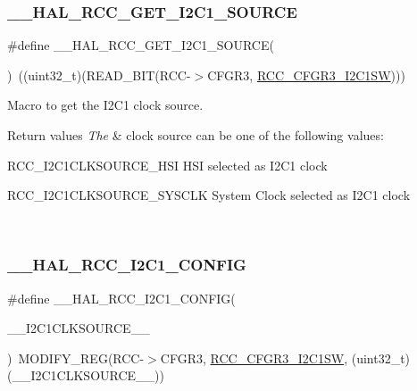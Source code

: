 \subsubsection{\texorpdfstring{\+\_\+\+\_\+\+H\+A\+L\+\_\+\+R\+C\+C\+\_\+\+G\+E\+T\+\_\+\+I2\+C1\+\_\+\+S\+O\+U\+R\+CE}{\_\_HAL\_RCC\_GET\_I2C1\_SOURCE}}
{\footnotesize\ttfamily \#define \+\_\+\+\_\+\+H\+A\+L\+\_\+\+R\+C\+C\+\_\+\+G\+E\+T\+\_\+\+I2\+C1\+\_\+\+S\+O\+U\+R\+CE(\begin{DoxyParamCaption}{ }\end{DoxyParamCaption})~((uint32\+\_\+t)(R\+E\+A\+D\+\_\+\+B\+IT(R\+CC-\/$>$C\+F\+G\+R3, \hyperlink{group___peripheral___registers___bits___definition_gae5a2d49d45df299ff751fb904570d070}{R\+C\+C\+\_\+\+C\+F\+G\+R3\+\_\+\+I2\+C1\+SW})))}



Macro to get the I2\+C1 clock source. 


\begin{DoxyRetVals}{Return values}
{\em The} & clock source can be one of the following values\+: \begin{DoxyItemize}
\item R\+C\+C\+\_\+\+I2\+C1\+C\+L\+K\+S\+O\+U\+R\+C\+E\+\_\+\+H\+SI H\+SI selected as I2\+C1 clock \item R\+C\+C\+\_\+\+I2\+C1\+C\+L\+K\+S\+O\+U\+R\+C\+E\+\_\+\+S\+Y\+S\+C\+LK System Clock selected as I2\+C1 clock \end{DoxyItemize}
\\
\hline
\end{DoxyRetVals}
\mbox{\label{group___r_c_c___i2_cx___clock___config_gaa6b4549872ed37d14913c6e0bd91a671}} 
\subsubsection{\texorpdfstring{\+\_\+\+\_\+\+H\+A\+L\+\_\+\+R\+C\+C\+\_\+\+I2\+C1\+\_\+\+C\+O\+N\+F\+IG}{\_\_HAL\_RCC\_I2C1\_CONFIG}}
{\footnotesize\ttfamily \#define \+\_\+\+\_\+\+H\+A\+L\+\_\+\+R\+C\+C\+\_\+\+I2\+C1\+\_\+\+C\+O\+N\+F\+IG(\begin{DoxyParamCaption}\item[{}]{\+\_\+\+\_\+\+I2\+C1\+C\+L\+K\+S\+O\+U\+R\+C\+E\+\_\+\+\_\+ }\end{DoxyParamCaption})~M\+O\+D\+I\+F\+Y\+\_\+\+R\+EG(R\+CC-\/$>$C\+F\+G\+R3, \hyperlink{group___peripheral___registers___bits___definition_gae5a2d49d45df299ff751fb904570d070}{R\+C\+C\+\_\+\+C\+F\+G\+R3\+\_\+\+I2\+C1\+SW}, (uint32\+\_\+t)(\+\_\+\+\_\+\+I2\+C1\+C\+L\+K\+S\+O\+U\+R\+C\+E\+\_\+\+\_\+))}



